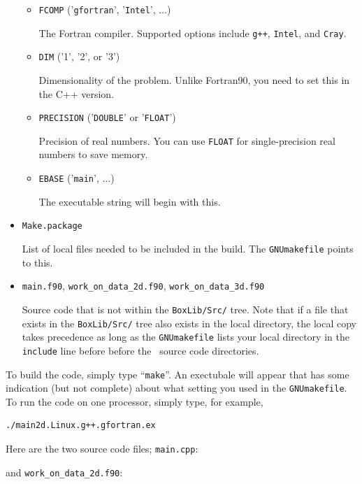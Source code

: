 \begin{itemize}
\begin{itemize}
    \item {\tt FCOMP} ('{\tt gfortran}', '{\tt Intel}', $\ldots$)

    The Fortran compiler.  Supported options include {\tt g++}, {\tt Intel}, and
    {\tt Cray}.

    \item {\tt DIM} ('1', '2', or '3')

    Dimensionality of the problem.  Unlike Fortran90, you need to set this in the C++ version.

    \item {\tt PRECISION} ('{\tt DOUBLE}' or '{\tt FLOAT}')

    Precision of real numbers.  You can use {\tt FLOAT} for single-precision real numbers to save memory.

    \item {\tt EBASE} ('{\tt main}', $\ldots$)

    The executable string will begin with this.

  \end{itemize}

\item {\tt Make.package}

List of local files needed to be included in the build.  The {\tt GNUmakefile} points to this.

\item {\tt main.f90}, {\tt work\_on\_data\_2d.f90}, {\tt work\_on\_data\_3d.f90}

Source code that is not within the {\tt BoxLib/Src/} tree.  Note that if a file that 
exists in the
{\tt BoxLib/Src/} tree also exists in the local directory, the local copy takes precedence
as long as the {\tt GNUmakefile} lists your local directory in the {\tt include} line before
before the \BoxLib\ source code directories.

\end{itemize}

To build the code, simply type ``{\tt make}''.  An exectubale will appear that has some indication (but not complete)
about what setting you used in the {\tt GNUmakefile}.  To run the code on one processor, simply type, for example,
\begin{lstlisting}[backgroundcolor=\color{light-red}]
./main2d.Linux.g++.gfortran.ex
\end{lstlisting}

Here are the two source code files; {\tt main.cpp}:

and {\tt work\_on\_data\_2d.f90}:


